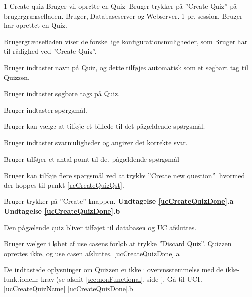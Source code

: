 
\uchead
	{1}
	{Create quiz}
	{Bruger vil oprette en Quiz.}
	{Bruger trykker på ''Create Quiz'' på brugergrænsefladen.}
	{Bruger, Databaseserver og Webserver.}
	{}
	{1 pr. session.}
	{Bruger har oprettet en Quiz.}

\item Brugergrænsefladen viser de forskellige konfigurationsmuligheder, som Bruger har til rådighed ved ''Create Quiz''.

\item \label{ucCreateQuizName} Bruger indtaster navn på Quiz, og dette tilføjes automatisk som et søgbart tag til Quizzen.

\item Bruger indtaster søgbare tags på Quiz.

\item \label{ucCreateQuizQst} Bruger indtaster spørgsmål.

\item Bruger kan vælge at tilføje et billede til det pågældende spørgsmål.

\item Bruger indtaster svarmuligheder og angiver det korrekte svar.

\item Bruger tilføjer et antal point til det pågældende spørgsmål.

\item Bruger kan tilføje flere spørgsmål ved at trykke ''Create new question'', hvormed der hoppes til punkt \ref{ucCreateQuizQst}.

\item \label{ucCreateQuizDone} Bruger trykker på ''Create'' knappen.
\textbf{Undtagelse \ref{ucCreateQuizDone}.a} \textbf{Undtagelse \ref{ucCreateQuizDone}.b}

\item \label{ucCreateQuizDB} Den pågælende quiz bliver tilføjet til databasen og UC afsluttes.

\ucdescriptionend

\ucextension
	{Bruger vælger i løbet af use casens forløb at trykke ''Discard Quiz''.}
	{Quizzen oprettes ikke, og use casen afsluttes.}
	{\ref{ucCreateQuizDone}.a}
	
\ucextension
	{De indtastede oplysninger om Quizzen er ikke i overensstemmelse med de ikke-funktionelle krav (se afsnit \ref{sec:nonFunctional}, side \pageref{sec:nonFunctional}).}
	{Gå til UC1.\ref{ucCreateQuizName}}
	{\ref{ucCreateQuizDone}.b}
		
